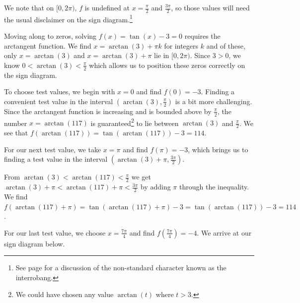 \documentclass{ximera}
\begin{document}
\begin{example}
\begin{explanation}
\begin{enumerate}
 

We note that on $[0,2\pi)$, $f$ is undefined at $x =\frac{\pi}{2}$ and $\frac{3\pi}{2}$, so those values will need the usual disclaimer on the sign diagram.\footnote{See page \pageref{rationalsigndiagram} for a discussion of the non-standard character known as the interrobang.}  

 

Moving along to zeros, solving $f(x) = \tan(x) - 3 = 0$ requires the arctangent function.  We find $x = \arctan(3) + \pi k$ for integers $k$ and of these, only $x = \arctan(3)$ and $x = \arctan(3) + \pi$ lie in $[0,2\pi)$.  Since $3 > 0$, we know $0 < \arctan(3) < \frac{\pi}{2}$ which allows us to position these zeros correctly on the sign diagram. 

 

To choose test values, we begin with $x=0$ and find $f(0) = -3$. Finding a convenient test value in the interval $\left(\arctan(3), \frac{\pi}{2}\right)$ is a bit more challenging.  Since the arctangent function is increasing and is bounded above by $\frac{\pi}{2}$,  the number $x = \arctan(117)$ is guaranteed\footnote{We could have chosen any value $\arctan(t)$ where $t > 3$.} to lie between  $\arctan(3)$ and $\frac{\pi}{2}$.  We see that $f(\arctan(117)) = \tan(\arctan(117)) - 3 = 114$.  

 

For our next test value, we take $x = \pi$ and find $f(\pi) = -3$, which brings us to finding a test value in the interval $\left(\arctan(3) + \pi, \frac{3\pi}{2} \right)$.

 

From $\arctan(3) < \arctan(117) < \frac{\pi}{2}$ we get $\arctan(3) + \pi < \arctan(117) + \pi < \frac{3\pi}{2}$ by adding $\pi$ through the inequality.  We find $f(\arctan(117)+\pi) = \tan(\arctan(117) + \pi) -3 = \tan(\arctan(117)) - 3 = 114$.  

 

For our last test value, we choose $x = \frac{7\pi}{4}$ and find $f\left(\frac{7\pi}{4}\right) = -4$.   We arrive at our sign diagram below.

\begin{image}
% 
\end{image}


\end{enumerate}
\end{explanation}
\end{example}
\end{document}

